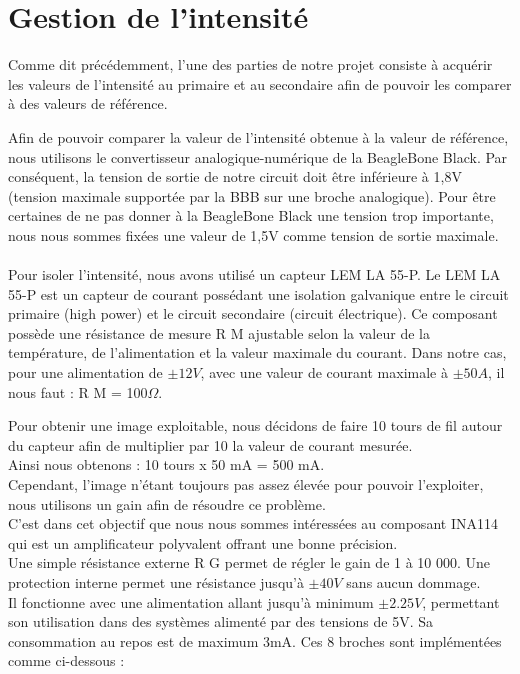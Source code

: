 \documentclass{report}
\begin{document}
\section{Gestion de l'intensit\'{e}}

Comme dit pr\'{e}c\'{e}demment, l’une des parties de notre projet consiste \`{a} acqu\'{e}rir les valeurs
de l’intensit\'{e} au primaire et au secondaire afin de pouvoir les comparer \`{a} des valeurs de
r\'{e}f\'{e}rence.\\

\begin{center}
\end{center}

Afin de pouvoir comparer la valeur de l’intensit\'{e} obtenue \`{a} la valeur de r\'{e}f\'{e}rence, nous
utilisons le convertisseur analogique-num\'{e}rique de la BeagleBone Black. Par cons\'{e}quent, la
tension de sortie de notre circuit doit \^{e}tre inf\'{e}rieure \`{a} 1,8V (tension maximale support\'{e}e par
la BBB sur une broche analogique). Pour \^{e}tre certaines de ne pas donner \`{a} la BeagleBone
Black une tension trop importante, nous nous sommes fix\'{e}es une valeur de 1,5V comme
tension de sortie maximale.\\ \\

Pour isoler l’intensit\'{e}, nous avons utilis\'{e} un capteur LEM LA 55-P.
Le LEM LA 55-P est un capteur de courant poss\'{e}dant une isolation galvanique entre le circuit
primaire (high power) et le circuit secondaire (circuit \'{e}lectrique).
Ce composant poss\`{e}de une r\'{e}sistance de mesure R M ajustable selon la valeur de la
temp\'{e}rature, de l’alimentation et la valeur maximale du courant. Dans notre cas, pour une
alimentation de $\pm 12V$, avec une valeur de courant maximale \`{a} $\pm 50A$, il nous faut :
R M = 100$\Omega$.



Pour obtenir une image exploitable, nous d\'{e}cidons de faire 10 tours de fil autour du capteur
afin de multiplier par 10 la valeur de courant mesur\'{e}e.\\
Ainsi nous obtenons : 10 tours x 50 mA = 500 mA.\\
Cependant, l’image n’\'{e}tant toujours pas assez \'{e}lev\'{e}e pour pouvoir l’exploiter, nous utilisons
un gain afin de r\'{e}soudre ce probl\`{e}me.\\
C’est dans cet objectif que nous nous sommes int\'{e}ress\'{e}es au composant INA114 qui est un
amplificateur polyvalent offrant une bonne pr\'{e}cision.\\
Une simple r\'{e}sistance externe R G permet de r\'{e}gler le gain de 1 \`{a} 10 000. Une protection
interne permet une r\'{e}sistance jusqu’\`{a} $\pm 40V$ sans aucun dommage.\\
Il fonctionne avec une alimentation allant jusqu’\`{a} minimum $\pm 2.25V$, permettant son
utilisation dans des syst\`{e}mes aliment\'{e} par des tensions de 5V. Sa consommation au repos
est de maximum 3mA. Ces 8 broches sont impl\'{e}ment\'{e}es comme ci-dessous :\\ 
\end{document}
